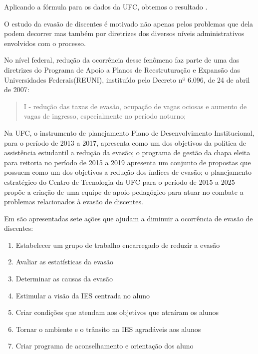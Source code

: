 Aplicando a fórmula para os dados da UFC, obtemos o resultado .


O estudo da evasão de discentes é motivado não apenas pelos problemas que dela podem decorrer mas também por diretrizes dos diversos níveis administrativos envolvidos com o processo.

No nível federal, redução da ocorrência desse fenômeno faz parte de uma das diretrizes do Programa de Apoio a Planos de Reestruturação e Expansão das Universidades Federais(REUNI), instituído pelo Decreto nº 6.096, de 24 de abril de 2007\cite{reuni}:
\begin{quote}
I - redução das taxas de evasão, ocupação de vagas ociosas e aumento de vagas de ingresso, especialmente no período noturno;
\end{quote}

Na UFC, o instrumento de planejamento Plano de Desenvolvimento Institucional\cite{pdi_ufc}, para o período de 2013 a 2017, apresenta como um dos objetivos da política de assistência estudantil a redução da evasão; o programa de gestão da chapa eleita para reitoria no período de 2015 a 2019\cite{henry} apresenta um conjunto de propostas que possuem como um dos objetivos a redução dos índices de evasão; o planejamento estratégico do Centro de Tecnologia da UFC para o período de 2015 a 2025 propõe a criação de uma equipe de apoio pedagógico para atuar no combate a problemas relacionados à evasão de discentes.



Em \cite{evasao_panorama2} são apresentadas sete ações que ajudam a diminuir a ocorrência de evasão de discentes:

\begin{enumerate}

\item Estabelecer um grupo de trabalho encarregado de reduzir a evasão
\item Avaliar as estatísticas da evasão
\item Determinar as causas da evasão
\item Estimular a visão da IES centrada no aluno
\item Criar condições que atendam aos objetivos que atraíram os alunos
\item Tornar o ambiente e o trânsito na IES agradáveis aos alunos
\item Criar programa de aconselhamento e orientação dos aluno

\end{enumerate}

